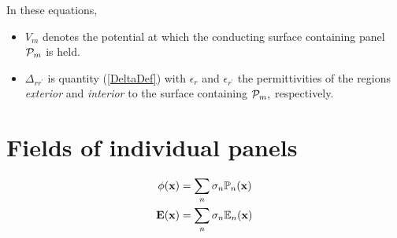 \documentclass[letterpaper]{article}
\begin{document}
In these equations, 
\begin{itemize}
 \item $V_m$ denotes the potential at which the conducting surface
       containing panel $\mathcal{P}_m$ is held.
 \item $\Delta_{rr^\prime}$ is quantity (\ref{DeltaDef}) with $\epsilon_r$
       and $\epsilon_{r^\prime}$ the permittivities of the regions 
       \textit{exterior} and \textit{interior} to the surface containing
       $\mathcal{P}_m,$ respectively.
\end{itemize}

\section*{Fields of individual panels}

\begin{align*}
 \phi(\mathbf{x}) &= \sum_n \sigma_n \mathbb{P}_n(\mathbf{x}) \\
 \mathbf{E}(\mathbf{x}) &= \sum_n \sigma_n \mathbb{E}_n(\mathbf{x}) \\
\end{align*}
\end{document}
